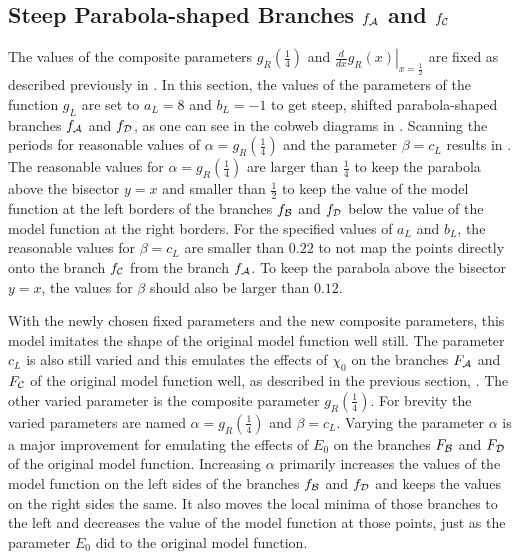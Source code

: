 \subsection{Steep Parabola-shaped Branches $f_{\mathcal{A}}$ and $f_{\mathcal{C}}$}
\label{sec:setup.quad.hyper.1}

The values of the composite parameters $g_R\left(\frac{1}{4}\right)$ and $\left. \frac{d}{dx} g_R\left(x\right) \right|_{x = \frac{1}{2}}$ are fixed as described previously in .
In this section, the values of the parameters of the function $g_L$ are set to $a_L = 8$ and $b_L = -1$ to get steep, shifted parabola-shaped branches $f_{\mathcal{A}}$ and $f_{\mathcal{D}}$, as one can see in the cobweb diagrams in .
Scanning the periods for reasonable values of $\alpha = g_R\left(\frac{1}{4}\right)$ and the parameter $\beta = c_L$ results in .
The reasonable values for $\alpha = g_R\left(\frac{1}{4}\right)$ are larger than $\frac{1}{4}$ to keep the parabola above the bisector $y = x$ and smaller than $\frac{1}{2}$ to keep the value of the model function at the left borders of the branches $f_{\mathcal{B}}$ and $f_{\mathcal{D}}$ below the value of the model function at the right borders.
For the specified values of $a_L$ and $b_L$, the reasonable values for $\beta = c_L$ are smaller than $0.22$ to not map the points directly onto the branch $f_{\mathcal{C}}$ from the branch $f_{\mathcal{A}}$.
To keep the parabola above the bisector $y = x$, the values for $\beta$ should also be larger than $0.12$.

With the newly chosen fixed parameters and the new composite parameters, this model imitates the shape of the original model function well still.
The parameter $c_L$ is also still varied and this emulates the effects of $\chi_0$ on the branches $F_{\mathcal{A}}$ and $F_{\mathcal{C}}$ of the original model function well, as described in the previous section, .
The other varied parameter is the composite parameter $g_R\left(\frac{1}{4}\right)$.
For brevity the varied parameters are named $\alpha = g_R\left(\frac{1}{4}\right)$ and $\beta = c_L$.
Varying the parameter $\alpha$ is a major improvement for emulating the effects of $E_0$ on the branches $F_{\mathcal{B}}$ and $F_{\mathcal{D}}$ of the original model function.
Increasing $\alpha$ primarily increases the values of the model function on the left sides of the branches $f_{\mathcal{B}}$ and $f_{\mathcal{D}}$ and keeps the values on the right sides the same.
It also moves the local minima of those branches to the left and decreases the value of the model function at those points, just as the parameter $E_0$ did to the original model function.

